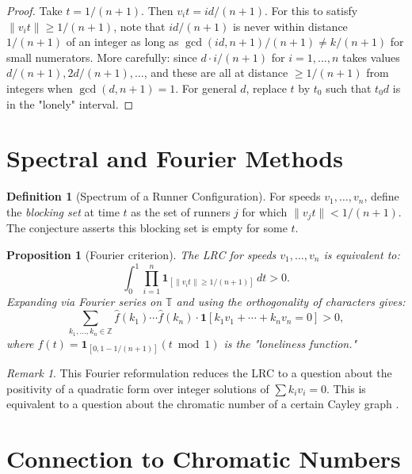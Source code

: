 \documentclass[12pt,a4paper]{amsart}
\newtheorem{proposition}[theorem]{Proposition}
\theoremstyle{definition}
\newtheorem{definition}[theorem]{Definition}
\theoremstyle{remark}
\newtheorem{remark}[theorem]{Remark}
\newcommand{\Z}{\mathbb{Z}}
\newcommand{\T}{\mathbb{T}}
\begin{document}
\begin{proof}
Take $t = 1/(n+1)$. Then $v_i t = id/(n+1)$. For this to satisfy $\|v_i t\| \geq 1/(n+1)$,
note that $id/(n+1)$ is never within distance $1/(n+1)$ of an integer as long as
$\gcd(id, n+1)/(n+1) \neq k/(n+1)$ for small numerators. More carefully: since
$d \cdot i/(n+1)$ for $i = 1, \ldots, n$ takes values $d/(n+1), 2d/(n+1), \ldots$,
and these are all at distance $\geq 1/(n+1)$ from integers when $\gcd(d, n+1) = 1$.
For general $d$, replace $t$ by $t_0$ such that $t_0 d$ is in the "lonely" interval.
\end{proof}

\section{Spectral and Fourier Methods}\label{sec:spectral}

\begin{definition}[Spectrum of a Runner Configuration]
For speeds $v_1, \ldots, v_n$, define the \emph{blocking set} at time $t$ as the
set of runners $j$ for which $\|v_j t\| < 1/(n+1)$. The conjecture asserts this
blocking set is empty for some $t$.
\end{definition}

\begin{proposition}[Fourier criterion]\label{prop:fourier}
The LRC for speeds $v_1, \ldots, v_n$ is equivalent to:
\[
  \int_0^1 \prod_{i=1}^{n} \mathbf{1}_{[\|v_i t\| \geq 1/(n+1)]} \, dt > 0.
\]
Expanding via Fourier series on $\T$ and using the orthogonality of characters
gives:
\[
  \sum_{k_1, \ldots, k_n \in \Z} \widehat{f}(k_1) \cdots \widehat{f}(k_n) \cdot
  \mathbf{1}[k_1 v_1 + \cdots + k_n v_n = 0] > 0,
\]
where $f(t) = \mathbf{1}_{[0, 1-1/(n+1)]}(t \bmod 1)$ is the "loneliness function."
\end{proposition}

\begin{remark}
This Fourier reformulation reduces the LRC to a question about the positivity of
a quadratic form over integer solutions of $\sum k_i v_i = 0$. This is equivalent
to a question about the chromatic number of a certain Cayley graph \cite{TothCayley2001}.
\end{remark}

\section{Connection to Chromatic Numbers}\label{sec:chromatic}
\end{document}
